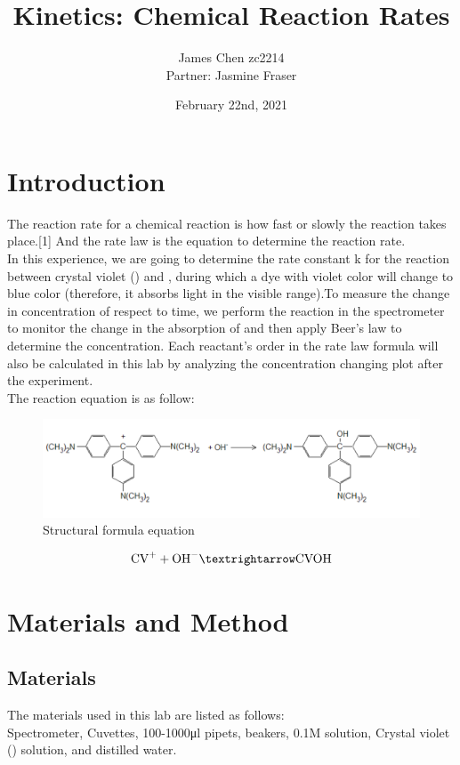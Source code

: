 \documentclass{article}
\title{Kinetics: Chemical Reaction Rates}
\author{James Chen zc2214\\Partner: Jasmine Fraser}
\date{February 22nd, 2021}
\begin{document}
\maketitle

\section{Introduction}
The reaction rate for a chemical reaction is how fast or slowly the reaction takes place.[1] And the rate law is the equation to determine the reaction rate.\\ In this experience, we are going to determine the rate constant k for the reaction between crystal violet () and , during which a dye with violet color will change to blue color (therefore, it absorbs light in the visible range).To measure the change in concentration of  respect to time, we perform the reaction in the spectrometer to monitor the change in the absorption of  and then apply Beer’s law to determine the concentration. Each reactant's order in the rate law formula will also be calculated in this lab by analyzing the concentration changing plot after the experiment.\\
The reaction equation is as follow:\\
\begin{figure}[H] 
\centering
\includegraphics[scale=0.5]{Structural formula.png}
\caption{Structural formula equation}
\label{fig:Structural formula equation}
\end{figure}
\begin{equation}
\ce{CV+} + \ce{OH-} → \ce{CVOH}
\end{equation}


\section{Materials and Method}
\subsection{Materials}
The materials used in this lab are listed as follows:\\
Spectrometer, Cuvettes, 100-1000μl pipets, beakers, 0.1M  solution, Crystal violet () solution, and distilled water.
\end{document}
